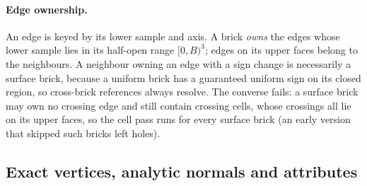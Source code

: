 \paragraph{Edge ownership.}
An edge is keyed by its lower sample and axis. A brick \emph{owns} the
edges whose lower sample lies in its half-open range $[0,B)^3$; edges on
its upper faces belong to the neighbours. A neighbour owning an edge with a
sign change is necessarily a surface brick, because a uniform brick has a
guaranteed uniform sign on its closed region, so cross-brick references
always resolve. The converse fails: a surface brick may own no crossing edge
and still contain crossing cells, whose crossings all lie on its upper
faces, so the cell pass runs for every surface brick (an early version
that skipped such bricks left holes).

\subsection{Exact vertices, analytic normals and attributes}
\label{sec:refine}

